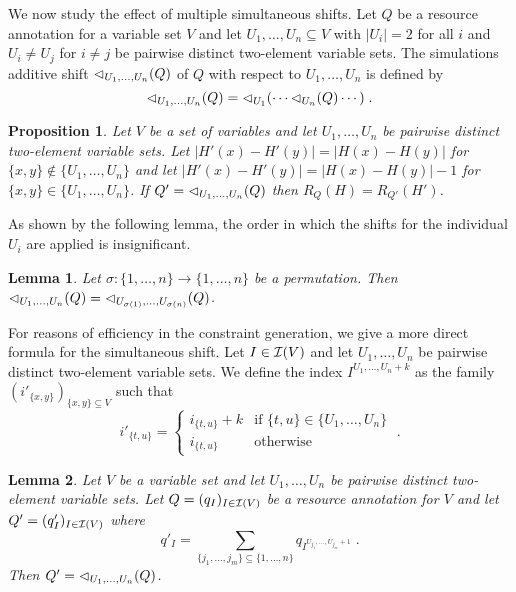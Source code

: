 \documentclass[nocopyrightspace,preprint]{sigplanconf}
\newtheorem{lemma}{Lemma}
\newtheorem{proposition}{Proposition}
\begin{document}
We now study the effect of multiple simultaneous shifts.  Let $Q$ be a
resource annotation for a variable set $V$ and let $U_1,\ldots,U_n
\subseteq V$ with $|U_i| = 2$ for all $i$ and $U_i \neq U_j$ for $i
\neq j$ be pairwise distinct two-element variable sets.  The
simulations additive shift ${\lhd}_{U_1,\ldots,U_n}(Q)$ of $Q$ with
respect to $U_1,\ldots,U_n$ is defined by
$$
{\lhd}_{U_1,\ldots,U_n}(Q) = {\lhd}_{U_1}( \cdots {\lhd}_{U_n}(Q) \cdots ) \; .
$$
%
\begin{proposition}
  Let $V$ be a set of variables and let $U_1,\ldots,U_n$ be pairwise
  distinct two-element variable sets.  Let $|H'(x) {-} H'(y)| = |H(x)
  {-} H(y)|$ for $\{x,y\} \not\in \{U_1,\ldots,U_n\}$ and let $|H'(x)
  {-} H'(y)| = |H(x) {-} H(y)| - 1$ for $\{x,y\} \in
  \{U_1,\ldots,U_n\}$.
  If $Q' = {\lhd}_{U_1,\ldots,U_n}(Q)$ then $R_Q(H) = R_{Q'}(H')$.
\end{proposition}
%
As shown by the following lemma, the order in which the shifts for the
individual $U_i$ are applied is insignificant.
%
\begin{lemma}
  Let $\sigma : \{1,\ldots,n\} \to \{1,\ldots,n\}$ be a
  permutation. Then ${\lhd}_{U_1,\ldots,U_n}(Q) =
  {\lhd}_{U_{\sigma(1)},\ldots,U_{\sigma(n)}}(Q)$.
\end{lemma}
%
For reasons of efficiency in the constraint generation, we give a more
direct formula for the simultaneous shift.  Let $I \in \mathcal{I}(V)$ and
let $U_1,\ldots,U_n$ be pairwise distinct two-element variable sets.
We define the index $I^{U_1,\ldots,U_n + k}$ as the family $(i'_{\{x,y\}})_{\{x,y\} \subseteq V}$ such that
$$
i'_{\{t,u\}} = \left\{
  \begin{array}{ll}
    i_{\{t,u\}} + k  & \text{if } \{t,u\} \in \{U_1,\ldots,U_n\} \\
    i_{\{t,u\}} & \text{otherwise}
  \end{array}
\right.  \;.
$$

%
\begin{lemma}
  Let $V$ be a variable set and let $U_1,\ldots,U_n$ be pairwise
  distinct two-element variable sets.
  Let $Q = (q_I)_{I \in \mathcal{I}(V)}$ be a resource annotation for
  $V$ and let $ Q' = (q'_I)_{I \in \mathcal{I}(V)}$ where
  $$
  q'_I = \sum_{\{j_1,\ldots,j_m\} \subseteq \{1,\ldots,n\} } q_{I^{U_{j_1},\ldots,U_{j_m}+1}} \; .
  $$
  Then $Q' = {\lhd}_{U_1,\ldots,U_n}(Q)$.
\end{lemma}




\end{document}
